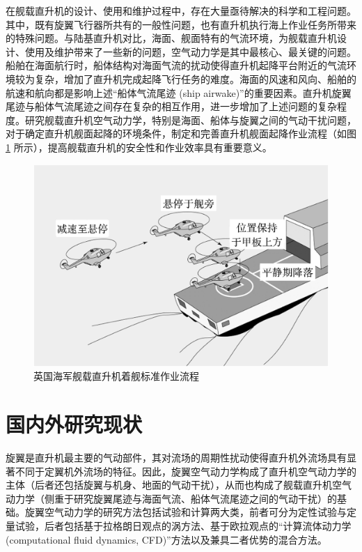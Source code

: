 在舰载直升机的设计、使用和维护过程中，存在大量亟待解决的科学和工程问题。其中，既有旋翼飞行器所共有的一般性问题，也有直升机执行海上作业任务所带来的特殊问题。与陆基直升机对比，海面、舰面特有的气流环境，为舰载直升机设计、使用及维护带来了一些新的问题，空气动力学是其中最核心、最关键的问题。船舶在海面航行时，船体结构对海面气流的扰动使得直升机起降平台附近的气流环境较为复杂，增加了直升机完成起降飞行任务的难度。海面的风速和风向、船舶的航速和航向都是影响上述“船体气流尾迹
(ship airwake)”的重要因素。直升机旋翼尾迹与船体气流尾迹之间存在复杂的相互作用，进一步增加了上述问题的复杂程度。研究舰载直升机空气动力学，特别是海面、船体与旋翼之间的气动干扰问题，对于确定直升机舰面起降的环境条件，制定和完善直升机舰面起降作业流程（如图
\ref{fig:landing} 所示），提高舰载直升机的安全性和作业效率具有重要意义。

\begin{figure}[h!]
\begin{centering}
\includegraphics[width=1\textwidth,height=0.3\textheight,keepaspectratio]{figures/landing}
\par\end{centering}
\caption{\label{fig:landing}英国海军舰载直升机着舰标准作业流程}
\end{figure}


\section{国内外研究现状}

旋翼是直升机最主要的气动部件，其对流场的周期性扰动使得直升机外流场具有显著不同于定翼机外流场的特征。因此，旋翼空气动力学构成了直升机空气动力学的主体（后者还包括旋翼与机身、地面的气动干扰），从而也构成了舰载直升机空气动力学（侧重于研究旋翼尾迹与海面气流、船体气流尾迹之间的气动干扰）的基础。旋翼空气动力学的研究方法包括试验和计算两大类，前者可分为定性试验与定量试验，后者包括基于拉格朗日观点的涡方法、基于欧拉观点的“计算流体动力学
(computational fluid dynamics, CFD)”方法以及兼具二者优势的混合方法。

